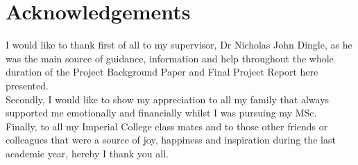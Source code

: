 \chapter*{Acknowledgements}

I would like to thank first of all to my supervisor, Dr Nicholas John Dingle, as he was the main source of guidance, information and help throughout the whole duration of the Project Background Paper and Final Project Report here presented.\\

Secondly, I would like to show my appreciation to all my family that always supported me emotionally and financially whilst I was pursuing my MSc.\\

Finally, to all my Imperial College class mates and to those other friends or colleagues that were a source of joy, happiness and inspiration during the last academic year, hereby I thank you all.\\

\addtocounter{page}{-2}
